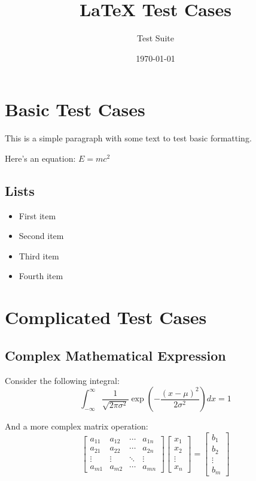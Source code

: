 \documentclass{article}
\title{LaTeX Test Cases}
\author{Test Suite}
\date{\today}
\begin{document}
\maketitle

\section{Basic Test Cases}

This is a simple paragraph with some text to test basic formatting.

Here's an equation: $E = mc^2$

\subsection{Lists}

\begin{itemize}
    \item First item
    \item Second item
    \item Third item
    \item Fourth item
\end{itemize}

\section{Complicated Test Cases}

\subsection{Complex Mathematical Expression}

Consider the following integral:
\[
    \int_{-\infty}^{\infty} \frac{1}{\sqrt{2\pi\sigma^2}} \exp\left(-\frac{(x-\mu)^2}{2\sigma^2}\right) dx = 1
\]

And a more complex matrix operation:
\[
    \begin{bmatrix}
        a_{11} & a_{12} & \cdots & a_{1n} \\
        a_{21} & a_{22} & \cdots & a_{2n} \\
        \vdots & \vdots & \ddots & \vdots \\
        a_{m1} & a_{m2} & \cdots & a_{mn}
    \end{bmatrix}
    \begin{bmatrix}
        x_1 \\ x_2 \\ \vdots \\ x_n
    \end{bmatrix}
    =
    \begin{bmatrix}
        b_1 \\ b_2 \\ \vdots \\ b_m
    \end{bmatrix}
\]
\end{document}
